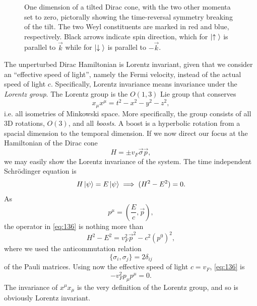 \begin{figure}[h]
  \centering
  \caption{One dimension of a tilted Dirac cone, with the two other momenta set to zero, pictorally showing the time-reversal symmetry breaking of the tilt.
    The two Weyl constituents are marked in red and blue, respectively.
    Black arrows indicate spin direction, which for \(\ket{\uparrow {}}\) is parallel to  \(\vec{k}\) while for \(\ket{\downarrow {}}\) is parallel to \( -\vec{k} \).
    \label{fig:spin-struct-tilt}
  }
\end{figure}

The unperturbed Dirac Hamiltonian is Lorentz invariant, given that we consider an ``effective speed of light'', namely the Fermi velocity, instead of the actual speed of light \( c \).
Specifically, Lorentz invariance means invariance under the \emph{Lorentz group}.
The Lorentz group is the \( O(1,3) \) Lie group that conserves
\[
x_{\mu } x^{\mu } = t^2 - x^2 - y^2 - z^2,
\]
i.e. all isometries of Minkowski space.
More specifically, the group consists of all 3D rotations, \( O(3) \), and all \emph{boosts}.
A boost is a hyperbolic rotation from a spacial dimension to the temporal dimension.
If we now direct our focus at the Hamiltonian of the Dirac cone
\[
H = \pm v_{F} \vec{\sigma} \vec{p},
\]
we may easily show the Lorentz invariance of the system.
The time independent Schrödinger equation is
\begin{equation}
  \label{eq:136}
  H \ket{\psi } = E \ket{\psi } \implies (H^2 - E^2) = 0.
\end{equation}
As
\[
p^{\mu } = \left(\frac{E}{c}, \vec{p}\right),
\]
the operator in \cref{eq:136} is nothing more than
\begin{equation}
  \label{eq:137}
  H^2-E^2 = v_{F}^2 \vec{p}^2 - c^2 \left(p^0\right)^2 ,
\end{equation}
where we used the anticommutation relation
\[
\{\sigma_{i}, \sigma_{j}\} =  2 \delta _{ij}
\]
of the Pauli matrices.
Using now the effective speed of light \( c=v_F \), \cref{eq:136} is
\begin{equation}
  \label{eq:138}
  - v_F^2 p_{\mu } p^{\mu } = 0.
\end{equation}
The invariance of \( x^{\mu} x_{\mu} \) is the very definition of the Lorentz group, and so is obviously Lorentz invariant.

